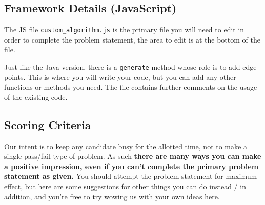 \documentclass[12pt]{article}
\begin{document}

\subsection*{Framework Details (JavaScript)}

The JS file \texttt{custom\_algorithm.js} is the primary file you will need to
edit in order to complete the problem statement, the area to edit is at the
bottom of the file.

Just like the Java version, there is a \texttt{generate} method
whose role is to add edge points. This is where you will write your code, but
you can add any other functions or methods you need. The file contains further
comments on the usage of the existing code.

\subsection*{Scoring Criteria}

Our intent is to keep any candidate busy for the allotted time, not to make a
single pass/fail type of problem. As such \textbf{there are many ways you can make a
positive impression, even if you can't complete the primary problem statement as
given.}
You should attempt the problem statement for maximum effect, but here are some
suggestions for other things you can do instead / in addition, and you're free
to try wowing us with your own ideas here.
\end{document}

